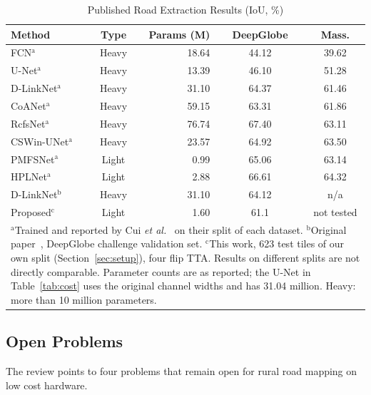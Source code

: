 \documentclass{ieeeaccess}
\begin{document}
\begin{table}[t]
\caption{Published Road Extraction Results (IoU, \%)}
\label{tab:literature}
\setlength{\tabcolsep}{3pt}
\tablebodyfont
\begin{tabular}{|l|c|r|c|c|}
\hline
Method & Type & Params (M) & DeepGlobe & Mass. \\
\hline
FCN$^{\mathrm{a}}$ & Heavy & 18.64 & 44.12 & 39.62 \\
U-Net$^{\mathrm{a}}$ & Heavy & 13.39 & 46.10 & 51.28 \\
D-LinkNet$^{\mathrm{a}}$ & Heavy & 31.10 & 64.37 & 61.46 \\
CoANet$^{\mathrm{a}}$ & Heavy & 59.15 & 63.31 & 61.86 \\
RcfsNet$^{\mathrm{a}}$ & Heavy & 76.74 & 67.40 & 63.11 \\
CSWin-UNet$^{\mathrm{a}}$ & Heavy & 23.57 & 64.92 & 63.50 \\
PMFSNet$^{\mathrm{a}}$ & Light & 0.99 & 65.06 & 63.14 \\
HPLNet$^{\mathrm{a}}$ & Light & 2.88 & 66.61 & 64.32 \\
\hline
D-LinkNet$^{\mathrm{b}}$ & Heavy & 31.10 & 64.12 & n/a \\
Proposed$^{\mathrm{c}}$ & Light & 1.60 & 61.1 & not tested \\
\hline
\multicolumn{5}{p{225pt}}{$^{\mathrm{a}}$Trained and reported by Cui \emph{et al.}~\cite{cui2025hplnet} on their split of each dataset. $^{\mathrm{b}}$Original paper~\cite{zhou2018dlinknet}, DeepGlobe challenge validation set. $^{\mathrm{c}}$This work, 623 test tiles of our own split (Section~\ref{sec:setup}), four flip TTA. Results on different splits are not directly comparable. Parameter counts are as reported; the U-Net in Table~\ref{tab:cost} uses the original channel widths and has 31.04 million. Heavy: more than 10 million parameters.}
\end{tabular}
\end{table}

\subsection{Open Problems}

The review points to four problems that remain open for rural road mapping on low cost hardware.
\end{document}
